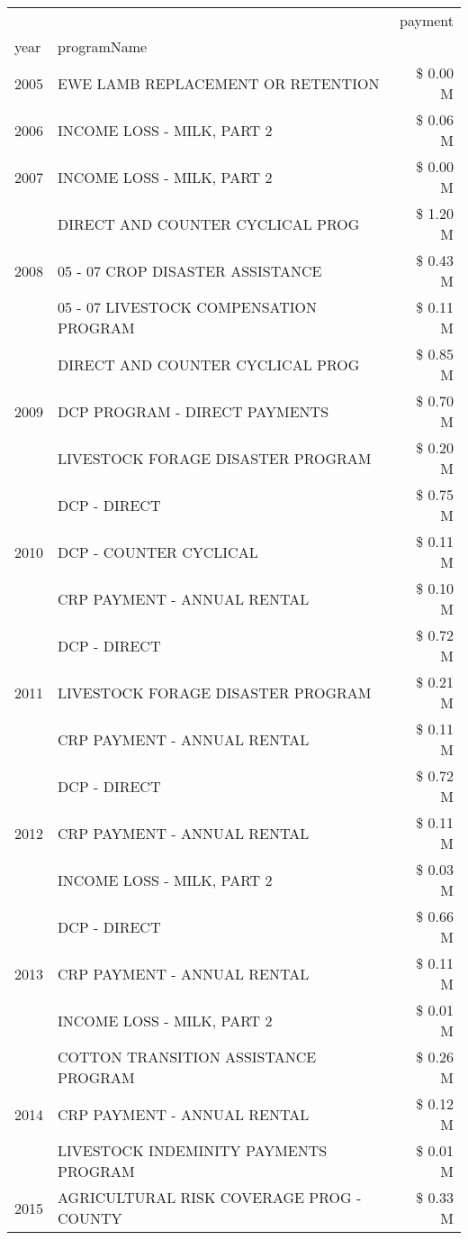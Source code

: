\begin{tabular}{llr}
\toprule
 &  & payment \\
year & programName &  \\
\midrule
2005 & EWE LAMB REPLACEMENT OR RETENTION & \$ 0.00 M \\
\cline{1-3}
2006 & INCOME LOSS - MILK, PART 2 & \$ 0.06 M \\
\cline{1-3}
2007 & INCOME LOSS - MILK, PART 2 & \$ 0.00 M \\
\cline{1-3}
\multirow[t]{3}{*}{2008} & DIRECT AND COUNTER CYCLICAL PROG & \$ 1.20 M \\
 & 05 - 07 CROP DISASTER ASSISTANCE & \$ 0.43 M \\
 & 05 - 07 LIVESTOCK COMPENSATION PROGRAM & \$ 0.11 M \\
\cline{1-3}
\multirow[t]{3}{*}{2009} & DIRECT AND COUNTER CYCLICAL PROG & \$ 0.85 M \\
 & DCP PROGRAM - DIRECT PAYMENTS & \$ 0.70 M \\
 & LIVESTOCK FORAGE DISASTER  PROGRAM & \$ 0.20 M \\
\cline{1-3}
\multirow[t]{3}{*}{2010} & DCP - DIRECT & \$ 0.75 M \\
 & DCP - COUNTER CYCLICAL & \$ 0.11 M \\
 & CRP PAYMENT - ANNUAL RENTAL & \$ 0.10 M \\
\cline{1-3}
\multirow[t]{3}{*}{2011} & DCP - DIRECT & \$ 0.72 M \\
 & LIVESTOCK FORAGE DISASTER PROGRAM & \$ 0.21 M \\
 & CRP PAYMENT - ANNUAL RENTAL & \$ 0.11 M \\
\cline{1-3}
\multirow[t]{3}{*}{2012} & DCP - DIRECT & \$ 0.72 M \\
 & CRP PAYMENT - ANNUAL RENTAL & \$ 0.11 M \\
 & INCOME LOSS - MILK, PART 2 & \$ 0.03 M \\
\cline{1-3}
\multirow[t]{3}{*}{2013} & DCP - DIRECT & \$ 0.66 M \\
 & CRP PAYMENT - ANNUAL RENTAL & \$ 0.11 M \\
 & INCOME LOSS - MILK, PART 2 & \$ 0.01 M \\
\cline{1-3}
\multirow[t]{3}{*}{2014} & COTTON TRANSITION ASSISTANCE PROGRAM & \$ 0.26 M \\
 & CRP PAYMENT - ANNUAL RENTAL & \$ 0.12 M \\
 & LIVESTOCK INDEMINITY PAYMENTS PROGRAM & \$ 0.01 M \\
\cline{1-3}
\multirow[t]{3}{*}{2015} & AGRICULTURAL RISK COVERAGE PROG - COUNTY & \$ 0.33 M \\

\end{tabular}
